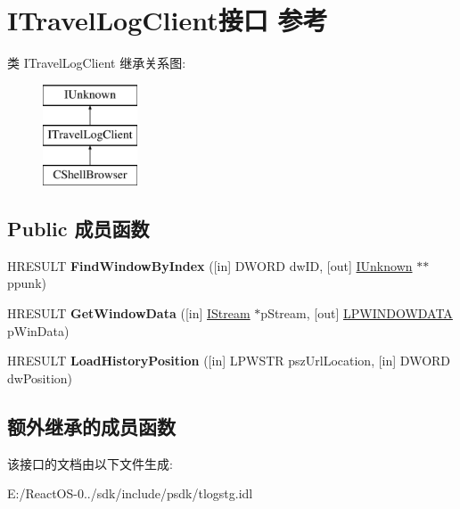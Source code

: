 \hypertarget{interface_i_travel_log_client}{}\section{I\+Travel\+Log\+Client接口 参考}
\label{interface_i_travel_log_client}
类 I\+Travel\+Log\+Client 继承关系图\+:\begin{figure}[H]
\begin{center}
\leavevmode
\includegraphics[height=3.000000cm]{interface_i_travel_log_client}
\end{center}
\end{figure}
\subsection*{Public 成员函数}
\begin{DoxyCompactItemize}
\item 
\mbox{\label{interface_i_travel_log_client_afa68af731e08aa65fa7b05f41644f41e}} 
H\+R\+E\+S\+U\+LT {\bfseries Find\+Window\+By\+Index} (\mbox{[}in\mbox{]} D\+W\+O\+RD dw\+ID, \mbox{[}out\mbox{]} \hyperlink{interface_i_unknown}{I\+Unknown} $\ast$$\ast$ppunk)
\item 
\mbox{\label{interface_i_travel_log_client_a8113d70f79e10ebc05c28348edcc0211}} 
H\+R\+E\+S\+U\+LT {\bfseries Get\+Window\+Data} (\mbox{[}in\mbox{]} \hyperlink{interface_i_stream}{I\+Stream} $\ast$p\+Stream, \mbox{[}out\mbox{]} \hyperlink{struct___w_i_n_d_o_w_d_a_t_a}{L\+P\+W\+I\+N\+D\+O\+W\+D\+A\+TA} p\+Win\+Data)
\item 
\mbox{\label{interface_i_travel_log_client_a3603f58a49030950a1908bdaaa70f4b9}} 
H\+R\+E\+S\+U\+LT {\bfseries Load\+History\+Position} (\mbox{[}in\mbox{]} L\+P\+W\+S\+TR psz\+Url\+Location, \mbox{[}in\mbox{]} D\+W\+O\+RD dw\+Position)
\end{DoxyCompactItemize}
\subsection*{额外继承的成员函数}


该接口的文档由以下文件生成\+:\begin{DoxyCompactItemize}
\item 
E\+:/\+React\+O\+S-\/0../sdk/include/psdk/tlogstg.\+idl\end{DoxyCompactItemize}
